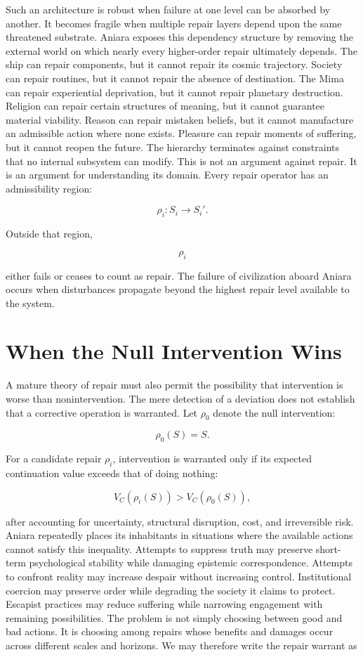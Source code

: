 \documentclass[11pt,oneside]{book}
\theoremstyle{definition}
\theoremstyle{remark}
\begin{document}
Such an architecture is robust when failure at one level can be absorbed by another. It becomes
fragile when multiple repair layers depend upon the same threatened substrate. Aniara exposes this
dependency structure by removing the external world on which nearly every higher-order repair
ultimately depends. The ship can repair components, but it cannot repair its cosmic trajectory.
Society can repair routines, but it cannot repair the absence of destination. The Mima can repair
experiential deprivation, but it cannot repair planetary destruction. Religion can repair certain
structures of meaning, but it cannot guarantee material viability. Reason can repair mistaken
beliefs, but it cannot manufacture an admissible action where none exists. Pleasure can repair
moments of suffering, but it cannot reopen the future. The hierarchy terminates against constraints
that no internal subsystem can modify. This is not an argument against repair. It is an argument for
understanding its domain. Every repair operator has an admissibility region:

\[
\rho_i:S_i\rightarrow S_i'.
\]

Outside that region,

\[
\rho_i
\]

either fails or ceases to count as repair. The failure of civilization aboard Aniara occurs when
disturbances propagate beyond the highest repair level available to the system.

\section{When the Null Intervention Wins}

A mature theory of repair must also permit the possibility that intervention is worse than
nonintervention. The mere detection of a deviation does not establish that a corrective operation is
warranted. Let \(\rho_0\) denote the null intervention:

\[
\rho_0(S)=S.
\]

For a candidate repair \(\rho_i\), intervention is warranted only if its expected continuation value
exceeds that of doing nothing:

\[
V_C(\rho_i(S)) > V_C(\rho_0(S)),
\]

after accounting for uncertainty, structural disruption, cost, and irreversible risk. Aniara
repeatedly places its inhabitants in situations where the available actions cannot satisfy this
inequality. Attempts to suppress truth may preserve short-term psychological stability while
damaging epistemic correspondence. Attempts to confront reality may increase despair without
increasing control. Institutional coercion may preserve order while degrading the society it claims
to protect. Escapist practices may reduce suffering while narrowing engagement with remaining
possibilities. The problem is not simply choosing between good and bad actions. It is choosing among
repairs whose benefits and damages occur across different scales and horizons. We may therefore
write the repair warrant as
\end{document}
